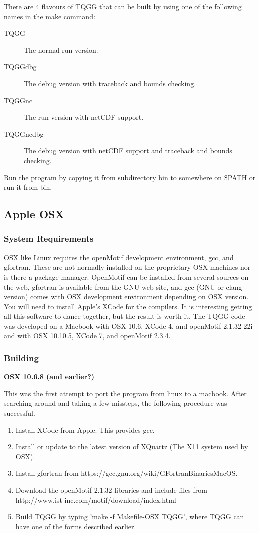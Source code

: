 \documentclass{article}
\begin{document}
There are 4 flavours of TQGG that can be built by using one of the following names in the make command:
\begin{description}
 \item [TQGG] The normal run version.
 \item [TQGGdbg] The debug version with traceback and bounds checking.
 \item [TQGGnc] The run version with netCDF support.
 \item [TQGGncdbg] The debug version with netCDF support and traceback and bounds checking.
\end{description}

Run the program by copying it from subdirectory bin to somewhere on \$PATH or run it from bin. 

\subsection{Apple OSX}
\subsubsection{System Requirements}
OSX like Linux requires the openMotif development environment, gcc, and gfortran. These are
not normally installed on the proprietary OSX machines nor is there a package manager. 
OpenMotif can be installed from several
sources on the web, gfortran is available from the GNU web site, and gcc (GNU or clang version) 
comes with OSX development environment depending on OSX version. You will need to install
Apple's XCode for the compilers. It is interesting getting all this software to dance together,
but the result is worth it. The TQGG code was developed on a Macbook with OSX 10.6,
XCode 4, and openMotif 2.1.32-22i and with OSX 10.10.5, XCode 7, and openMotif 2.3.4.

\subsubsection{Building}

 {\bf{OSX 10.6.8 (and earlier?)}}

This was the first attempt to port the program from linux to a macbook. After searching around
and taking a few missteps, the following procedure was successful.

\begin{enumerate}
 \item Install XCode from Apple. This provides gcc.
 \item Install or update to the latest version of XQuartz (The X11 system used by OSX). 
 \item Install gfortran from https://gcc.gnu.org/wiki/GFortranBinariesMacOS.
 \item Download the openMotif 2.1.32 libraries and include files from \\
 http://www.ist-inc.com/motif/download/index.html
 \item Build TQGG by typing 'make -f Makefile-OSX TQGG', where TQGG can have one of the forms described earlier.
\end{enumerate}
\end{document}
